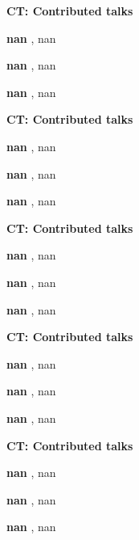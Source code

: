 \documentclass[ILAS2025-program.tex]{subfiles}
\begin{document}
\begin{description}
    \begin{description}
    \item[] {\color{mstitle}\textbf{CT: Contributed talks}} 
    \item[] \textbf{nan} , nan
        \item[] \textbf{nan} , nan
        \item[] \textbf{nan} , nan
        \end{description}
    \begin{description}
    \item[] {\color{mstitle}\textbf{CT: Contributed talks}} 
    \item[] \textbf{nan} , nan
        \item[] \textbf{nan} , nan
        \item[] \textbf{nan} , nan
        \end{description}
    \begin{description}
    \item[] {\color{mstitle}\textbf{CT: Contributed talks}} 
    \item[] \textbf{nan} , nan
        \item[] \textbf{nan} , nan
        \item[] \textbf{nan} , nan
        \end{description}
    \begin{description}
    \item[] {\color{mstitle}\textbf{CT: Contributed talks}} 
    \item[] \textbf{nan} , nan
        \item[] \textbf{nan} , nan
        \item[] \textbf{nan} , nan
        \end{description}
    \begin{description}
    \item[] {\color{mstitle}\textbf{CT: Contributed talks}} 
    \item[] \textbf{nan} , nan
        \item[] \textbf{nan} , nan
        \item[] \textbf{nan} , nan

\end{description}
\end{description}
\end{document}
